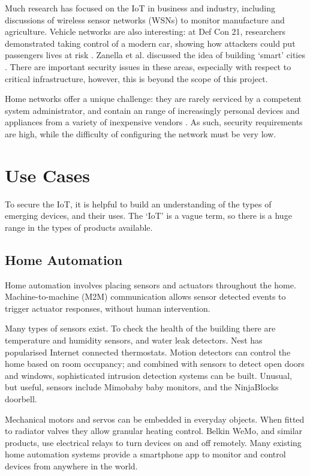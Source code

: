 \documentclass[10pt,journal,compsoc]{IEEEtran}
\begin{document}
Much research has focused on the IoT in business and industry, including
discussions of wireless sensor networks (WSNs) to monitor manufacture and
agriculture. Vehicle networks are also interesting: at Def Con 21, researchers
demonstrated taking control of a modern car, showing how attackers could put
passengers lives at risk \cite{Illera2014}. Zanella et al. discussed the idea
of building `smart' cities \cite{Zanella2014}. There are important security
issues in these areas, especially with respect to critical infrastructure,
however, this is beyond the scope of this project.  

Home networks offer a unique challenge: they are rarely serviced by a competent
system administrator, and contain an range of increasingly personal devices and
appliances from a variety of inexpensive vendors \cite{Denning2013}. As such,
security requirements are high, while the difficulty of configuring the network
must be very low. 

\section{Use Cases}
To secure the IoT, it is helpful to build an understanding of the types of
emerging devices, and their uses. The `IoT' is a vague term, so there
is a huge range in the types of products available.

\subsection{Home Automation}
Home automation involves placing sensors and actuators throughout the home.
Machine-to-machine (M2M) communication allows sensor detected events to trigger
actuator responses, without human intervention. 

Many types of sensors exist. To check the health of the building there are
temperature and humidity sensors, and water leak detectors. Nest has
popularised Internet connected thermostats. Motion detectors can control the
home based on room occupancy; and combined with sensors to detect open doors
and windows, sophisticated intrusion detection systems can be built. Unusual,
but useful, sensors include Mimobaby baby monitors, and the NinjaBlocks
doorbell.

Mechanical motors and servos can be embedded in everyday objects. When fitted
to radiator valves they allow granular heating control. Belkin WeMo, and
similar products, use electrical relays to turn devices on and off remotely.
Many existing home automation systems provide a smartphone app to monitor and
control devices from anywhere in the world. 
\end{document}
